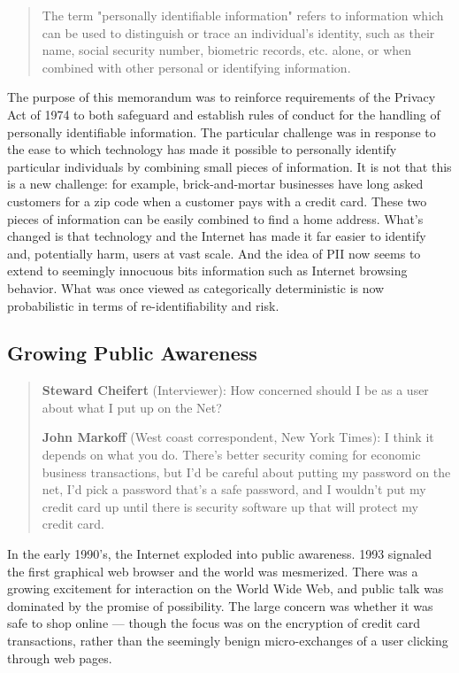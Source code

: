 \begin{quote}
The term "personally identifiable information" refers to information which can be used to distinguish or trace an individual's identity, such as their name, social security number, biometric records, etc. alone, or when combined with other personal or identifying information. \citep{OMB:2007vu}
\end{quote}

The purpose of this memorandum was to reinforce requirements of the Privacy Act of 1974 to both safeguard and establish rules of conduct for the handling of personally identifiable information. The particular challenge was in response to the ease to which technology has made it possible to personally identify particular individuals by combining small pieces of information. It is not that this is a new challenge: for example, brick-and-mortar businesses have long asked customers for a zip code when a customer pays with a credit card. These two pieces of information can be easily combined to find a home address. What's changed is that technology and the Internet has made it far easier to identify and, potentially harm, users at vast scale. And the idea of PII now seems to extend to seemingly innocuous bits information such as Internet browsing behavior. What was once viewed as categorically deterministic is now probabilistic in terms of re-identifiability and risk.

\subsection{Growing Public Awareness}
\label{growingpublicawareness}


\begin{quote}
\textbf{Steward Cheifert} (Interviewer): How concerned should I be as a user about what I put up on the Net?

\textbf{John Markoff} (West coast correspondent, New York Times): I think it depends on what you do. There's better security coming for economic business transactions, but I'd be careful about putting my password on the net, I'd pick a password that's a safe password, and I wouldn't put my credit card up until there is security software up that will protect my credit card. \citep{TheInternet:uu}
\end{quote}


In the early 1990's, the Internet exploded into public awareness. 1993 signaled the first graphical web browser and the world was mesmerized. There was a growing excitement for interaction on the World Wide Web, and public talk was dominated by the promise of possibility. The large concern was whether it was safe to shop online --- though the focus was on the encryption of credit card transactions, rather than the seemingly benign micro-exchanges of a user clicking through web pages. 

